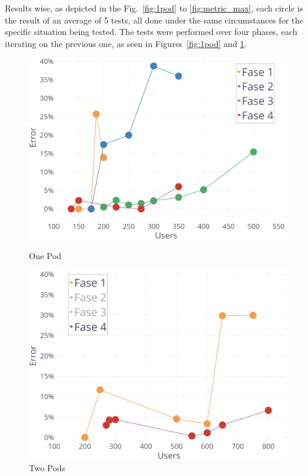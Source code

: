 Results wise, as depicted in the Fig.~\ref{fig:1pod} to \ref{fig:metric_max}, each circle is the result of an average of 5 tests, all done under the same circumstances for the specific situation being tested. The tests were performed over four phases, each iterating on the previous one, as seen in Figures~\ref{fig:1pod} and \ref{fig:2pods}.

\begin{figure}[t] 
  \label{fig7} 
  \begin{minipage}[b]{0.5\linewidth}
    \centering
    \includegraphics[width=1\linewidth]{Chapters/img/testing/1Pod.png} 
    \caption{One Pod} 
    \label{fig:1pod}
    \vspace{1ex}
  \end{minipage}%
  \begin{minipage}[b]{0.5\linewidth}
    \centering
    \includegraphics[width=1\linewidth]{Chapters/img/testing/2Pod.png} 
    \caption{Two Pods} 
    \label{fig:2pods}
    \vspace{1ex}
  \end{minipage} 
\end{figure}

